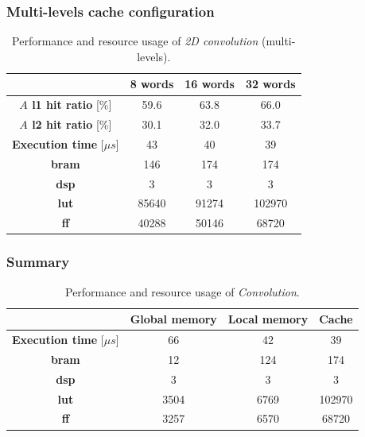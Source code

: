 \documentclass[11pt,a4paper,oneside]{memoir}
\begin{document}
\subsubsection{Multi-levels cache configuration}
\begin{table}[H]
	\begin{center}
		\begin{tabular}{cccc}
			\hline
			\rowcolor{gray!50}
			& \textbf{8 words} & \textbf{16 words} & \textbf{32 words} \\
			\hline
			\textbf{$A$ \ac{l1} hit ratio} [\%] & 59.6 & 63.8 & 66.0 \\
			\rowcolor{gray!25}
			\textbf{$A$ \ac{l2} hit ratio} [\%] & 30.1 & 32.0 & 33.7 \\
			\textbf{Execution time} [$\mu s$] & 43 & 40 & 39 \\
			\rowcolor{gray!25}
			\textbf{\ac{bram}} & 146 & 174 & 174 \\
			\textbf{\ac{dsp}} & 3 & 3 & 3 \\
			\rowcolor{gray!25}
			\textbf{\acs{lut}} & 85640 & 91274 & 102970 \\
			\textbf{\acs{ff}} & 40288 & 50146 & 68720 \\
			\hline
		\end{tabular}
	\end{center}
	\caption{Performance and resource usage of \emph{2D convolution}
	(multi-levels).}
	\label{tab:conv_l1_report}
\end{table}

\subsubsection{Summary}
\begin{table}[H]
	\begin{center}
		\begin{tabular}{cccc}
			\hline
			\rowcolor{gray!50}
			& \textbf{Global memory} & \textbf{Local memory} &
			\textbf{Cache} \\
			\hline
			\textbf{Execution time} [$\mu s$] & 66 & 42 & 39 \\
			\rowcolor{gray!25}
			\textbf{\ac{bram}} & 12 & 124 & 174 \\
			\textbf{\acs{dsp}} & 3 & 3 & 3 \\
			\rowcolor{gray!25}
			\textbf{\acs{lut}} & 3504 & 6769 & 102970 \\
			\textbf{\acs{ff}} & 3257 & 6570 & 68720 \\
			\hline
		\end{tabular}
	\end{center}
	\caption{Performance and resource usage of \emph{Convolution}.}
	\label{tab:conv_report}
\end{table}
\end{document}
